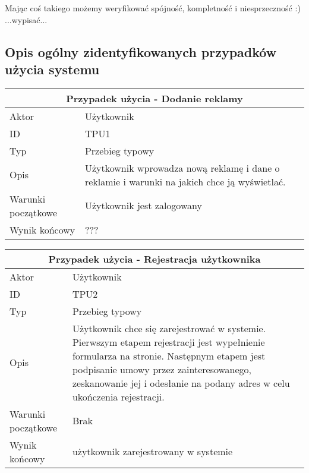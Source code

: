\documentclass[10pt,a4paper,titlepage]{article} %
\begin{document}
		Mając coś takiego możemy weryfikować spójność, kompletność i niesprzeczność :)\newline
		...wypisać...\newline

		\subsection{Opis ogólny zidentyfikowanych przypadków użycia systemu}

		\begin {center}
		\begin{tabular}{|l|p{10cm}|}
		  \hline
		  \multicolumn{2}{|c|}{\bf Przypadek użycia - Dodanie reklamy}\\\hline
		  \hline
		  Aktor & Użytkownik \\ \hline
		  ID & TPU1 \\ \hline
		  Typ & Przebieg typowy \\ \hline
		  Opis & Użytkownik wprowadza nową reklamę i dane o reklamie i warunki na jakich chce ją wyświetlać. \\ \hline
		  Warunki początkowe & Użytkownik jest zalogowany \\ \hline
		  Wynik końcowy & ??? \\
		  \hline
		\end{tabular}
		\end{center}
		
		\begin {center}
		\begin{tabular}{|l|p{10cm}|}
		  \hline
		  \multicolumn{2}{|c|}{\bf Przypadek użycia - Rejestracja użytkownika}\\\hline
		  \hline
		  Aktor & Użytkownik \\ \hline
		  ID & TPU2 \\ \hline
		  Typ & Przebieg typowy \\ \hline
		  Opis & Użytkownik chce się zarejestrować w systemie. Pierwszym etapem
		  rejestracji jest wypełnienie formularza na stronie. Następnym etapem jest podpisanie umowy przez
		  zainteresowanego, zeskanowanie jej i odesłanie na podany adres w celu
		  ukończenia rejestracji. \\
		  \hline Warunki początkowe & Brak \\ \hline
		  Wynik końcowy & użytkownik zarejestrowany w systemie \\
		  \hline
		\end{tabular}
		\end{center}
\end{document}
